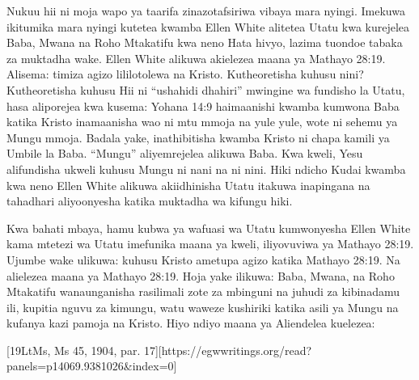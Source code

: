 Nukuu hii ni moja wapo ya taarifa zinazotafsiriwa vibaya mara nyingi. Imekuwa ikitumika mara nyingi kutetea kwamba Ellen White alitetea Utatu kwa kurejelea Baba, Mwana na Roho Mtakatifu kwa neno  Hata hivyo, lazima tuondoe tabaka za muktadha wake. Ellen White alikuwa akielezea maana ya Mathayo 28:19. Alisema:  timiza agizo lililotolewa na Kristo. Kutheoretisha kuhusu nini? Kutheoretisha kuhusu  Hii ni “ushahidi dhahiri” mwingine wa fundisho la Utatu, hasa aliporejea  kwa kusema:  Yohana 14:9 haimaanishi kwamba kumwona Baba katika Kristo inamaanisha wao ni mtu mmoja na yule yule, wote ni sehemu ya Mungu mmoja. Badala yake, inathibitisha kwamba Kristo ni chapa kamili ya Umbile la Baba. “Mungu” aliyemrejelea alikuwa Baba. Kwa kweli, Yesu alifundisha ukweli kuhusu Mungu ni nani na ni nini. Hiki ndicho   Kudai kwamba kwa neno  Ellen White alikuwa akiidhinisha Utatu itakuwa inapingana na tahadhari aliyoonyesha katika muktadha wa kifungu hiki.


Kwa bahati mbaya, hamu kubwa ya wafuasi wa Utatu kumwonyesha Ellen White kama mtetezi wa Utatu imefunika maana ya kweli, iliyovuviwa ya Mathayo 28:19. Ujumbe wake ulikuwa:  kuhusu  Kristo ametupa agizo katika Mathayo 28:19. Na alielezea maana ya Mathayo 28:19. Hoja yake ilikuwa: Baba, Mwana, na Roho Mtakatifu wanaunganisha rasilimali zote za mbinguni na juhudi za kibinadamu ili, kupitia nguvu za kimungu, watu waweze kushiriki katika asili ya Mungu na kufanya kazi pamoja na Kristo. Hiyo ndiyo maana ya  Aliendelea kuelezea:


[19LtMs, Ms 45, 1904, par. 17][https://egwwritings.org/read?panels=p14069.9381026&index=0]


